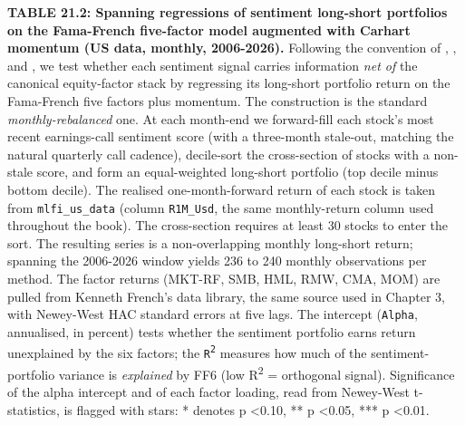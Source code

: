 \textbf{TABLE 21.2: Spanning regressions of sentiment long-short portfolios on the Fama-French five-factor model augmented with Carhart momentum (US data, monthly, 2006-2026).} Following the convention of \cite{tetlock2007giving}, \cite{loughran2011liability}, and \cite{ke2019predicting}, we test whether each sentiment signal carries information \textit{net of} the canonical equity-factor stack by regressing its long-short portfolio return on the Fama-French five factors plus momentum. The construction is the standard \textit{monthly-rebalanced} one. At each month-end we forward-fill each stock's most recent earnings-call sentiment score (with a three-month stale-out, matching the natural quarterly call cadence), decile-sort the cross-section of stocks with a non-stale score, and form an equal-weighted long-short portfolio (top decile minus bottom decile). The realised one-month-forward return of each stock is taken from \texttt{mlfi\_us\_data} (column \texttt{R1M\_Usd}, the same monthly-return column used throughout the book). The cross-section requires at least 30 stocks to enter the sort. The resulting series is a non-overlapping monthly long-short return; spanning the 2006-2026 window yields 236 to 240 monthly observations per method. The factor returns (MKT-RF, SMB, HML, RMW, CMA, MOM) are pulled from Kenneth French's data library, the same source used in Chapter 3, with Newey-West HAC standard errors at five lags. The intercept (\texttt{Alpha}, annualised, in percent) tests whether the sentiment portfolio earns return unexplained by the six factors; the \texttt{R\textsuperscript{2}} measures how much of the sentiment-portfolio variance is \textit{explained} by FF6 (low R\textsuperscript{2} = orthogonal signal). Significance of the alpha intercept and of each factor loading, read from Newey-West t-statistics, is flagged with stars: * denotes p \textless  0.10, ** p \textless  0.05, *** p \textless  0.01.

